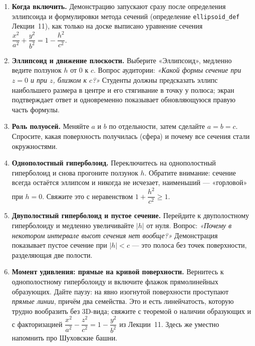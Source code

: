 \begin{enumerate}
  \item \textbf{Когда включить.} Демонстрацию запускают сразу после
    определения эллипсоида и формулировки метода сечений (определение
    \texttt{ellipsoid\_def} Лекции~11), как только на доске выписано
    уравнение сечения $\dfrac{x^2}{a^2} + \dfrac{y^2}{b^2} =
    1 - \dfrac{h^2}{c^2}$.

  \item \textbf{Эллипсоид и движение плоскости.} Выберите «Эллипсоид»,
    медленно ведите ползунок $h$ от $0$ к $c$. Вопрос аудитории:
    \emph{«Какой формы сечение при $z = 0$ и при $z$, близком к $c$?»}
    Студенты должны предсказать эллипс наибольшего размера в центре и
    его стягивание в точку у полюса; экран подтверждает ответ и
    одновременно показывает обновляющуюся правую часть формулы.

  \item \textbf{Роль полуосей.} Меняйте $a$ и $b$ по отдельности, затем
    сделайте $a = b = c$. Спросите, какая поверхность получилась
    (сфера) и почему все сечения стали окружностями.

  \item \textbf{Однополостный гиперболоид.} Переключитесь на
    однополостный гиперболоид и снова прогоните ползунок $h$. Обратите
    внимание: сечение всегда остаётся эллипсом и никогда не исчезает,
    наименьший --- «горловой» при $h = 0$. Свяжите это с неравенством
    $1 + \dfrac{h^2}{c^2} \ge 1$.

  \item \textbf{Двуполостный гиперболоид и пустое сечение.} Перейдите к
    двуполостному гиперболоиду и медленно увеличивайте $|h|$ от нуля.
    Вопрос: \emph{«Почему в некотором интервале высот сечения нет
    вообще?»} Демонстрация показывает пустое сечение при $|h| < c$ ---
    это полоса без точек поверхности, разделяющая две полости.

  \item \textbf{Момент удивления: прямые на кривой поверхности.}
    Вернитесь к однополостному гиперболоиду и включите флажок
    прямолинейных образующих. Дайте паузу: на явно изогнутой
    поверхности проступают \emph{прямые линии}, причём два семейства.
    Это и есть линейчатость, которую трудно вообразить без 3D-вида;
    свяжите с теоремой о наличии образующих и с факторизацией
    $\dfrac{x^2}{a^2} - \dfrac{z^2}{c^2} = 1 - \dfrac{y^2}{b^2}$ из
    Лекции~11. Здесь же уместно напомнить про Шуховские башни.


\end{enumerate}
